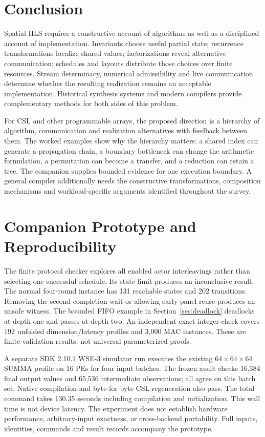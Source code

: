 \documentclass[final,3p,times,authoryear]{elsarticle}
\begin{document}
\section{Conclusion}
Spatial HLS requires a constructive account of algorithms as well as a disciplined account of implementation. Invariants choose useful partial state; recurrence transformations localize shared values; factorizations reveal alternative communication; schedules and layouts distribute those choices over finite resources. Stream determinacy, numerical admissibility and live communication determine whether the resulting realization remains an acceptable implementation. Historical synthesis systems and modern compilers provide complementary methods for both sides of this problem.

For CSL and other programmable arrays, the proposed direction is a hierarchy of algorithm, communication and realization alternatives with feedback between them. The worked examples show why the hierarchy matters: a shared index can generate a propagation chain, a boundary bottleneck can change the arithmetic formulation, a permutation can become a transfer, and a reduction can retain a tree. The companion supplies bounded evidence for one execution boundary. A general compiler additionally needs the constructive transformations, composition mechanisms and workload-specific arguments identified throughout the survey.





\appendix
\section{Companion Prototype and Reproducibility}
\label{app:prototype}
The finite protocol checker explores all enabled actor interleavings rather than selecting one successful schedule. Its state limit produces an inconclusive result. The normal four-round instance has 131 reachable states and 202 transitions. Removing the second completion wait or allowing early panel reuse produces an unsafe witness. The bounded FIFO example in Section~\ref{sec:deadlock} deadlocks at depth one and passes at depth two. An independent exact-integer check covers 192 unfolded dimension/latency profiles and 3,000 MAC instances. These are finite validation results, not universal parameterized proofs.

A separate SDK 2.10.1 WSE-3 simulator run executes the existing $64\times64\times64$ SUMMA profile on 16 PEs for four input batches. The frozen audit checks 16,384 final output values and 65,536 intermediate observations; all agree on this batch set. Native compilation and byte-for-byte CSL regeneration also pass. The total command takes 130.35 seconds including compilation and initialization. This wall time is not device latency. The experiment does not establish hardware performance, arbitrary-input exactness, or cross-backend portability. Full inputs, identities, commands and result records accompany the prototype.
\end{document}
